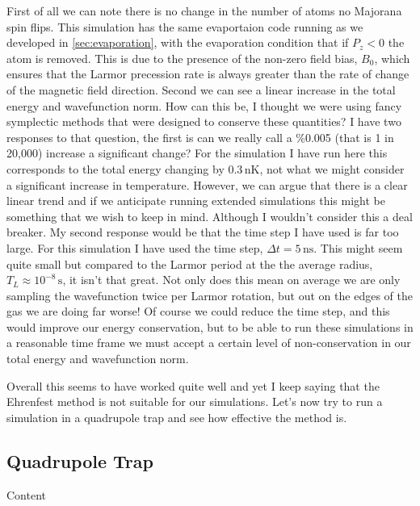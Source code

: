 First of all we can note there is no change in the number of atoms \ie no Majorana spin flips.
This simulation has the same evaportaion code running as we developed in \autoref{sec:evaporation}, with the evaporation condition that if $P_z < 0$ the atom is removed.
This is due to the presence of the non-zero field bias, $B_0$, which ensures that the Larmor precession rate is always greater than the rate of change of the magnetic field direction.
Second we can see a linear increase in the total energy and wavefunction norm.
How can this be, I thought we were using fancy symplectic methods that were designed to conserve these quantities?
I have two responses to that question, the first is can we really call a \%0.005 (that is 1 in 20,000) increase a significant change?
For the simulation I have run here this corresponds to the total energy changing by $0.3\,\mathrm{nK}$, not what we might consider a significant increase in temperature.
However, we can argue that there is a clear linear trend and if we anticipate running extended simulations this might be something that we wish to keep in mind.
Although I wouldn't consider this a deal breaker.
My second response would be that the time step I have used is far too large.
For this simulation I have used the time step, $\Delta t = 5\,\mathrm{ns}$.
This might seem quite small but compared to the Larmor period at the the average radius, $T_L\approx 10^{-8}\,\mathrm{s}$, it isn't that great.
Not only does this mean on average we are only sampling the wavefunction twice per Larmor rotation, but out on the edges of the gas we are doing far worse!
Of course we could reduce the time step, and this would improve our energy conservation, but to be able to run these simulations in a reasonable time frame we must accept a certain level of non-conservation in our total energy and wavefunction norm.

Overall this seems to have worked quite well and yet I keep saying that the Ehrenfest method is not suitable for our simulations.
Let's now try to run a simulation in a quadrupole trap and see how effective the method is.

\subsection{Quadrupole Trap} \label{sec:EhrenfestQuad}

Content